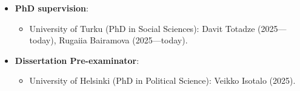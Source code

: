 \begin{itemize}

  \item[\textcolor{gray}{\textbullet}] {\bf PhD supervision}: 

    \begin{itemize}
      \item[-]  University of Turku (PhD in Social Sciences): Davit Totadze (2025---today), Rugaiia Bairamova (2025---today).
    \end{itemize}


   \item[\textcolor{gray}{\textbullet}] {\bf Dissertation Pre-examinator}: 

    \begin{itemize}
      \item[-]  University of Helsinki (PhD in Political Science): Veikko Isotalo (2025).
    \end{itemize}

\end{itemize}